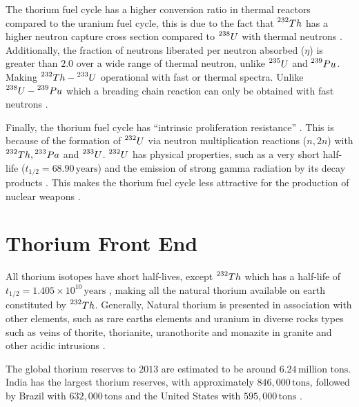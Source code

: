The thorium fuel cycle has a higher conversion ratio in thermal reactors compared to the uranium fuel cycle, this is due to the fact that \(\prescript{232}{}{Th}\) has a higher neutron capture cross section compared to \(\prescript{238}{}{U}\) with thermal neutrons \cite{IAEA_Th_Potential}. Additionally, the fraction of neutrons liberated per neutron absorbed (\(\eta\)) is greater than \(2.0\) over a wide range of thermal neutron, unlike \(\prescript{235}{}{U}\) and \(\prescript{239}{}{Pu}\). Making \(\prescript{232}{}{Th} - \prescript{233}{}{U}\) operational with fast or thermal spectra. Unlike \(\prescript{238}{}{U} - \prescript{239}{}{Pu}\) which a breading chain reaction can only be obtained with fast neutrons \cite{IAEA_Th_Potential}.

Finally, the thorium fuel cycle has ``intrinsic proliferation resistance'' \cite{IAEA_Th_Potential}. This is because of the formation of \(\prescript{232}{}{U}\) via neutron multiplication reactions (\(n,2n\)) with \(\prescript{232}{}{Th}, \prescript{233}{}{Pa}\) and \(\prescript{233}{}{U}\). \(\prescript{232}{}{U}\) has physical properties, such as a very short half-life (\(t_{1/2} = 68.90 \, \text{years} \)) and the emission of strong gamma radiation by its decay products \cite{IAEA_Th_Potential,NNDC}. This makes the thorium fuel cycle less attractive for the production of nuclear weapons \cite{IAEA_Th_Potential}.

\section{Thorium Front End}

All thorium isotopes have short half-lives, except \(\prescript{232}{}{Th}\) which has a half-life of \(t_{1/2} = 1.405 \times 10^{10} \, \text{years}\) \cite{NNDC}, making all the natural thorium available on earth constituted by \(\prescript{232}{}{Th}\). Generally, Natural thorium is presented in association with other elements, such as rare earths elements and uranium in diverse rocks types such as veins of thorite, thorianite, uranothorite and  monazite in granite and other acidic intrusions \cite{IAEA_Th_Potential}. 

The global thorium reserves to \(2013\) are estimated to be around \(6.24 \, \text{million tons}\). India has the largest thorium reserves, with approximately \(846,000 \, \text{tons}\), followed by Brazil with \(632,000 \, \text{tons}\) and the United States with \(595,000 \, \text{tons}\) \cite{Th_cycle_viability}.

